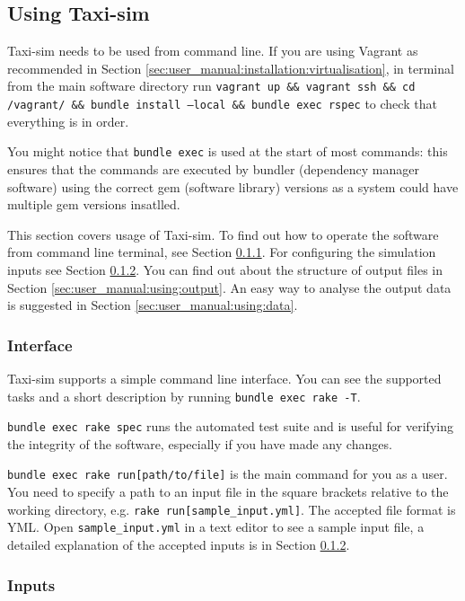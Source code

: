 \subsection{Using Taxi-sim}
\label{sec:user_manual:using}

Taxi-sim needs to be used from command line. If you are using Vagrant as
recommended in Section \ref{sec:user_manual:installation:virtualisation}, in
terminal from the main software directory run \texttt{vagrant up \&\& vagrant
ssh \&\& cd /vagrant/ \&\& bundle install --local \&\& bundle exec rspec} to
check that everything is in order.

You might notice that \texttt{bundle exec} is used at the start of most
commands: this ensures that the commands are executed by bundler (dependency
manager software) using the correct gem (software library) versions as a system
could have multiple gem versions insatlled.

This section covers usage of Taxi-sim. To find out how to operate the software
from command line terminal, see Section \ref{sec:user_manual:using:interface}.
For configuring the simulation inputs see Section
\ref{sec:user_manual:using:inputs}. You can find out about the structure of
output files in Section \ref{sec:user_manual:using:output}. An easy way to
analyse the output data is suggested in Section
\ref{sec:user_manual:using:data}.

\subsubsection{Interface}
\label{sec:user_manual:using:interface}

Taxi-sim supports a simple command line interface. You can see the supported
tasks and a short description by running \texttt{bundle exec rake -T}.

\texttt{bundle exec rake spec} runs the automated test suite and is useful for
verifying the integrity of the software, especially if you have made any
changes.

\texttt{bundle exec rake run[path/to/file]} is the main command for you as a
user. You need to specify a path to an input file in the square brackets
relative to the working directory, e.g. \texttt{rake run[sample\_input.yml]}.
The accepted file format is YML. Open \texttt{sample\_input.yml} in a text
editor to see a sample input file, a detailed explanation of the accepted
inputs is in Section \ref{sec:user_manual:using:inputs}.


\subsubsection{Inputs}
\label{sec:user_manual:using:inputs}

